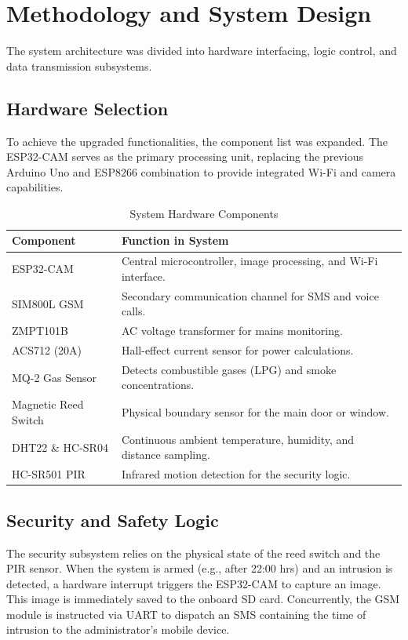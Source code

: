 \documentclass[12pt,a4paper]{article}
\begin{document}
\section{Methodology and System Design}
The system architecture was divided into hardware interfacing, logic control, and data transmission subsystems. 

\subsection{Hardware Selection}
To achieve the upgraded functionalities, the component list was expanded. The ESP32-CAM serves as the primary processing unit, replacing the previous Arduino Uno and ESP8266 combination to provide integrated Wi-Fi and camera capabilities.

\begin{table}[H]
\centering
\begin{tabular}{|l|p{9cm}|}
\hline
\textbf{Component} & \textbf{Function in System} \\ \hline
ESP32-CAM & Central microcontroller, image processing, and Wi-Fi interface. \\ \hline
SIM800L GSM & Secondary communication channel for SMS and voice calls. \\ \hline
ZMPT101B & AC voltage transformer for mains monitoring. \\ \hline
ACS712 (20A) & Hall-effect current sensor for power calculations. \\ \hline
MQ-2 Gas Sensor & Detects combustible gases (LPG) and smoke concentrations. \\ \hline
Magnetic Reed Switch & Physical boundary sensor for the main door or window. \\ \hline
DHT22 \& HC-SR04 & Continuous ambient temperature, humidity, and distance sampling. \\ \hline
HC-SR501 PIR & Infrared motion detection for the security logic. \\ \hline
\end{tabular}
\caption{System Hardware Components}
\end{table}

\subsection{Security and Safety Logic}
The security subsystem relies on the physical state of the reed switch and the PIR sensor. When the system is armed (e.g., after 22:00 hrs) and an intrusion is detected, a hardware interrupt triggers the ESP32-CAM to capture an image. This image is immediately saved to the onboard SD card. Concurrently, the GSM module is instructed via UART to dispatch an SMS containing the time of intrusion to the administrator's mobile device.
\end{document}
